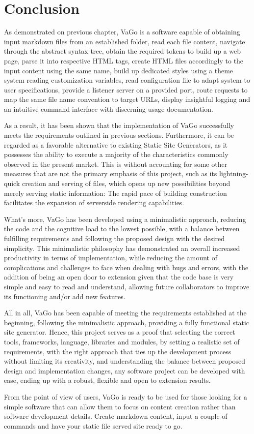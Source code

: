 

\chapter{Conclusion}\label{ch:conclusion}

As demonstrated on previous chapter, VaGo is a software capable of obtaining input markdown files from an established
folder, read each file content, navigate through the abstract syntax tree, obtain the required tokens to build up a
web page, parse it into respective HTML tags, create HTML files accordingly to the input content using the same name,
build up dedicated styles using a theme system reading customization variables, read configuration file to adapt
system to user specifications, provide a listener server on a provided port, route requests to map the same file name
convention to target URLs, display insightful logging and an intuitive command interface with discerning usage
documentation.


As a result, it has been shown that the implementation of VaGo successfully meets the requirements outlined in
previous sections.
Furthermore, it can be regarded as a favorable alternative to existing Static Site Generators, as
it possesses the ability to execute a majority of the characteristics commonly observed in the present market.
This is without accounting for some other measures that are not the primary emphasis of this project, such as its
lightning-quick creation and serving of files, which opens up new possibilities beyond merely serving static
information: The rapid pace of building construction facilitates the expansion of serverside rendering capabilities.


What's more, VaGo has been developed using a minimalistic approach, reducing the code and the cognitive load to the
lowest possible, with a balance between fulfilling requirements and following the proposed design with the desired
simplicity.
This minimalistic philosophy has demonstrated an overall increased productivity in terms of implementation, while
reducing the amount of complications and challenges to face when dealing with bugs and errors, with the addition of
being an open door to extension given that the code base is very simple and easy to read and understand, allowing
future collaborators to improve its functioning and/or add new features.

All in all, VaGo has been capable of meeting the requirements established at the beginning, following the minimalistic
approach, providing a fully functional static site generator.
Hence, this project serves as a proof that selecting the correct tools, frameworks, language, libraries and modules,
by setting a realistic set of requirements, with the right approach that ties up the development process without
limiting its creativity, and understanding the balance between proposed design and implementation changes, any software
project can be developed with ease, ending up with a robust, flexible and open to extension results.

From the point of view of users, VaGo is ready to be used for those looking for a simple software that can allow them
to focus on content creation rather than software development details.
Create markdown content, input a couple of commands and have your static file served site ready to go.
